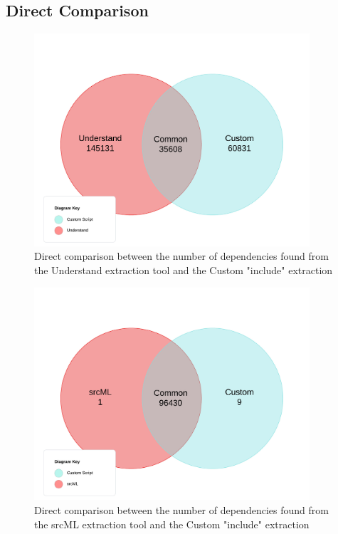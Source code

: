 \documentclass[12pt, dvipsnames, a4paper]{article}
\begin{document}
\subsection{Direct Comparison}

\begin{figure}[H]
	\center
	\includegraphics[width = 290pt]{assets/UnderstandCustom.jpeg}
	\caption{Direct comparison between the number of dependencies found from the Understand extraction tool and the Custom "include" extraction}
\end{figure}

\begin{figure}[H]
	\center
	\includegraphics[width = 290pt]{assets/srcMLCustom.jpeg}
	\caption{Direct comparison between the number of dependencies found from the srcML extraction tool and the Custom "include" extraction}
\end{figure}
\end{document}
